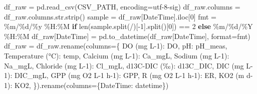 \documentclass[
  letterpaper,
  DIV=11,
  numbers=noendperiod]{scrartcl}
\newenvironment{Shaded}{\begin{snugshade}}{\end{snugshade}}
\newcommand{\BuiltInTok}[1]{\textcolor[rgb]{0.00,0.23,0.31}{#1}}
\newcommand{\ControlFlowTok}[1]{\textcolor[rgb]{0.00,0.23,0.31}{\textbf{#1}}}
\newcommand{\DecValTok}[1]{\textcolor[rgb]{0.68,0.00,0.00}{#1}}
\newcommand{\NormalTok}[1]{\textcolor[rgb]{0.00,0.23,0.31}{#1}}
\newcommand{\OperatorTok}[1]{\textcolor[rgb]{0.37,0.37,0.37}{#1}}
\newcommand{\SpecialCharTok}[1]{\textcolor[rgb]{0.37,0.37,0.37}{#1}}
\newcommand{\StringTok}[1]{\textcolor[rgb]{0.13,0.47,0.30}{#1}}
\begin{document}
\begin{Shaded}
\begin{Highlighting}[]
\NormalTok{df\_raw }\OperatorTok{=}\NormalTok{ pd.read\_csv(CSV\_PATH, encoding}\OperatorTok{=}\StringTok{\textquotesingle{}utf{-}8{-}sig\textquotesingle{}}\NormalTok{)}
\NormalTok{df\_raw.columns }\OperatorTok{=}\NormalTok{ df\_raw.columns.}\BuiltInTok{str}\NormalTok{.strip()}
\NormalTok{sample }\OperatorTok{=}\NormalTok{ df\_raw[}\StringTok{\textquotesingle{}DateTime\textquotesingle{}}\NormalTok{].iloc[}\DecValTok{0}\NormalTok{]}
\NormalTok{fmt }\OperatorTok{=} \StringTok{\textquotesingle{}\%m/}\SpecialCharTok{\%d}\StringTok{/\%y \%H:\%M\textquotesingle{}} \ControlFlowTok{if} \BuiltInTok{len}\NormalTok{(sample.split(}\StringTok{\textquotesingle{}/\textquotesingle{}}\NormalTok{)[}\OperatorTok{{-}}\DecValTok{1}\NormalTok{].split()[}\DecValTok{0}\NormalTok{]) }\OperatorTok{==} \DecValTok{2} \ControlFlowTok{else} \StringTok{\textquotesingle{}\%m/}\SpecialCharTok{\%d}\StringTok{/\%Y \%H:\%M\textquotesingle{}}
\NormalTok{df\_raw[}\StringTok{\textquotesingle{}DateTime\textquotesingle{}}\NormalTok{] }\OperatorTok{=}\NormalTok{ pd.to\_datetime(df\_raw[}\StringTok{\textquotesingle{}DateTime\textquotesingle{}}\NormalTok{], }\BuiltInTok{format}\OperatorTok{=}\NormalTok{fmt)}
\NormalTok{df\_raw }\OperatorTok{=}\NormalTok{ df\_raw.rename(columns}\OperatorTok{=}\NormalTok{\{}
    \StringTok{\textquotesingle{}DO (mg L{-}1)\textquotesingle{}}\NormalTok{: }\StringTok{\textquotesingle{}DO\textquotesingle{}}\NormalTok{, }\StringTok{\textquotesingle{}pH\textquotesingle{}}\NormalTok{: }\StringTok{\textquotesingle{}pH\_meas\textquotesingle{}}\NormalTok{, }\StringTok{\textquotesingle{}Temperature (°C)\textquotesingle{}}\NormalTok{: }\StringTok{\textquotesingle{}temp\textquotesingle{}}\NormalTok{,}
    \StringTok{\textquotesingle{}Calcium (mg L{-}1)\textquotesingle{}}\NormalTok{: }\StringTok{\textquotesingle{}Ca\_mgL\textquotesingle{}}\NormalTok{, }\StringTok{\textquotesingle{}Sodium (mg L{-}1)\textquotesingle{}}\NormalTok{: }\StringTok{\textquotesingle{}Na\_mgL\textquotesingle{}}\NormalTok{,}
    \StringTok{\textquotesingle{}Chloride (mg L{-}1)\textquotesingle{}}\NormalTok{: }\StringTok{\textquotesingle{}Cl\_mgL\textquotesingle{}}\NormalTok{,}
    \StringTok{\textquotesingle{}d13C{-}DIC (‰)\textquotesingle{}}\NormalTok{: }\StringTok{\textquotesingle{}d13C\_DIC\textquotesingle{}}\NormalTok{, }\StringTok{\textquotesingle{}DIC  (mg L{-}1)\textquotesingle{}}\NormalTok{: }\StringTok{\textquotesingle{}DIC\_mgL\textquotesingle{}}\NormalTok{,}
    \StringTok{\textquotesingle{}GPP (mg O2 L{-}1 h{-}1)\textquotesingle{}}\NormalTok{: }\StringTok{\textquotesingle{}GPP\textquotesingle{}}\NormalTok{, }\StringTok{\textquotesingle{}R (mg O2 L{-}1 h{-}1)\textquotesingle{}}\NormalTok{: }\StringTok{\textquotesingle{}ER\textquotesingle{}}\NormalTok{, }\StringTok{\textquotesingle{}KO2 (m d{-}1)\textquotesingle{}}\NormalTok{: }\StringTok{\textquotesingle{}KO2\textquotesingle{}}\NormalTok{,}
\NormalTok{\}).rename(columns}\OperatorTok{=}\NormalTok{\{}\StringTok{\textquotesingle{}DateTime\textquotesingle{}}\NormalTok{: }\StringTok{\textquotesingle{}datetime\textquotesingle{}}\NormalTok{\})}


\end{Highlighting}
\end{Shaded}
\end{document}
